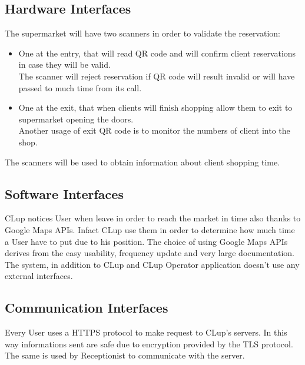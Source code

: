 \subsection{Hardware Interfaces}
The supermarket will have two scanners in order to validate the reservation:

\par \medskip 
\begin{itemize}
\item	One at the entry, that will read QR code and will confirm client reservations in case they will be valid. \\
The scanner will reject reservation if QR code will result invalid or will have passed to much time from its call.
\item One at the exit, that when clients will finish shopping allow them to exit to supermarket opening the doors. \\
Another usage of exit QR code is to monitor the numbers of client into the shop.
\end{itemize} 
\par \medskip 
The scanners will be used to obtain information about client shopping time.

\subsection{Software Interfaces}
CLup notices User when leave in order to reach the market in time also thanks to Google Maps APIs. Infact CLup use them in order to determine how much time a User have to put due to his position.
The choice of using Google Maps APIs derives from the easy usability, frequency update and very large documentation.
The system, in addition to CLup and CLup Operator application doesn't use any external interfaces.


\subsection{Communication Interfaces}
Every User uses a HTTPS protocol to make request to CLup's servers. In this way informations sent are safe due to encryption provided by the TLS protocol. The same is used by Receptionist to communicate with the server.

\pagebreak

